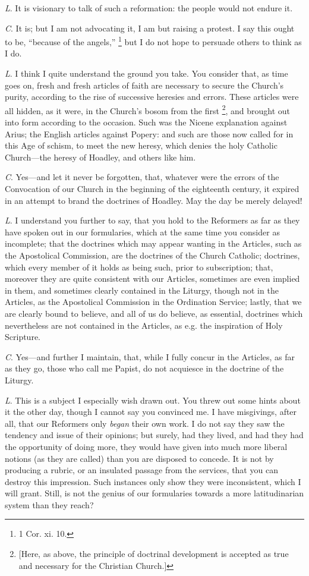 \emph{L}. It is visionary to talk of such a
reformation: the people would not endure it.

\emph{C}. It is; but I am not advocating it, I am
but raising a protest. I say this ought to be, ``because of the angels,''
\footnote{1 Cor. xi. 10.} but I do not hope to
persuade others to think as I do.

\emph{L}. I think I quite understand the ground
you take. You consider that, as time goes on, fresh and fresh articles
of faith are necessary to secure the Church's purity, according to the
rise of successive heresies and errors. These articles were all
hidden, as it were, in the Church's bosom from the first \footnote{[Here, as above, the principle of doctrinal development is accepted as
true and necessary for the Christian Church.]}, and brought out into form according to the occasion. Such was
the Nicene explanation against Arius; the English articles against
Popery: and such are those now called for in this Age of schism, to
meet the new heresy, which denies the holy Catholic Church—the
heresy of Hoadley, and others like him.

\emph{C}. Yes—and let it never be forgotten,
that, whatever were the errors of the Convocation of our Church in the
beginning of the eighteenth century, it expired in an attempt to brand
the doctrines of Hoadley. May the day be merely delayed!

\emph{L}. I understand you further to say, that
you hold to the Reformers as far as they have spoken out in our
formularies, which at the same time you consider as incomplete; that
the doctrines which may appear wanting in the Articles, such as the
Apostolical Commission, are the doctrines of the Church Catholic;
doctrines, which every member of it holds as being such, prior to
subscription; that, moreover they are quite consistent with our
Articles, sometimes are even implied in them, and sometimes clearly
contained in the Liturgy, though not in the Articles, as the
Apostolical Commission in the Ordination Service; lastly, that we are
clearly bound to believe, and all of us do believe, as essential,
doctrines which nevertheless are not contained in the Articles, as
e.g. the inspiration of Holy Scripture.

\emph{C}. Yes—and further I maintain, that,
while I fully concur in the Articles, as far as they go, those who
call me Papist, do not acquiesce in the doctrine of the Liturgy.

\emph{L}. This is a subject I especially wish
drawn out. You threw out some hints about it the other day, though I
cannot say you convinced me. I have misgivings, after all, that our
Reformers only \emph{began} their own work. I do not say they saw the
tendency and issue of their opinions; but surely, had they lived, and
had they had the opportunity of doing more, they would have given into
much more liberal notions (as they are called) than you are disposed
to concede. It is not by producing a rubric, or an insulated passage
from the services, that you can destroy this impression. Such
instances only show they were inconsistent, which I will grant. Still,
is not the genius of our formularies towards a more latitudinarian
system than they reach?


